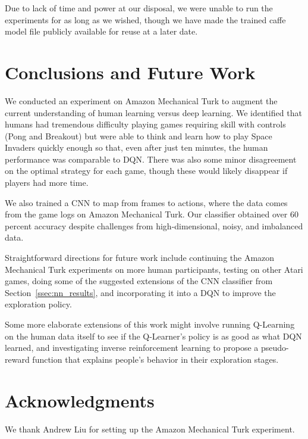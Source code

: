 \documentclass[letterpaper, 10 pt, conference]{ieeeconf}  %
\begin{document}
Due to lack of time and power at our disposal, we were unable to run the experiments for as long as
we wished, though we have made the trained caffe model file publicly available for reuse at a later
date.


\section{Conclusions and Future Work}\label{sec:conclusions}

We conducted an experiment on Amazon Mechanical Turk to augment the current understanding of human
learning versus deep learning. We identified that humans had tremendous difficulty playing games
requiring skill with controls (Pong and Breakout) but were able to think and learn how to play Space
Invaders quickly enough so that, even after just ten minutes, the human performance was comparable
to DQN. There was also some minor disagreement on the optimal strategy for each game, though these
would likely disappear if players had more time.

We also trained a CNN to map from frames to actions, where the data comes from the game logs on
Amazon Mechanical Turk. Our classifier obtained over 60 percent accuracy despite challenges from
high-dimensional, noisy, and imbalanced data.

Straightforward directions for future work include continuing the Amazon Mechanical Turk experiments
on more human participants, testing on other Atari games, doing some of the suggested extensions of
the CNN classifier from Section~\ref{ssec:nn_results}, and incorporating it into a DQN to improve
the exploration policy.

Some more elaborate extensions of this work might involve running Q-Learning on the human data
itself to see if the Q-Learner's policy is as good as what DQN learned, and investigating inverse
reinforcement learning to propose a pseudo-reward function that explains people's behavior in their
exploration stages.

\section*{Acknowledgments}

We thank Andrew Liu for setting up the Amazon Mechanical Turk experiment.


\end{document}
